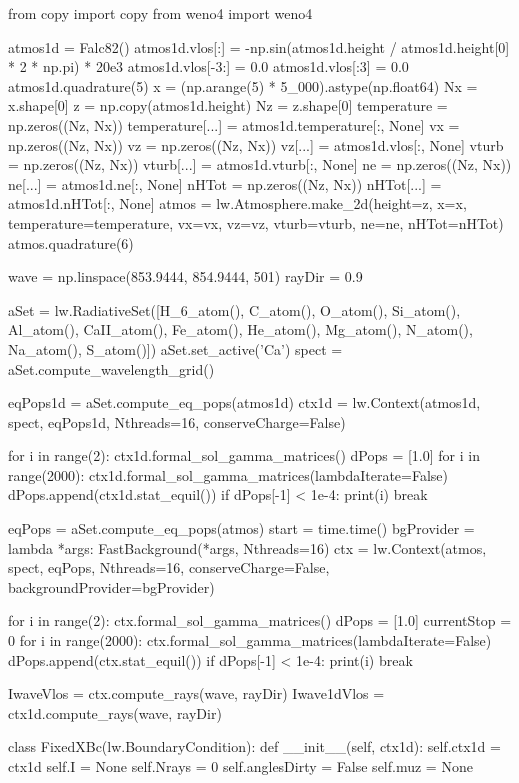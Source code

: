 \begin{pycode}[2DValidation]
from copy import copy
from weno4 import weno4

atmos1d = Falc82()
atmos1d.vlos[:] = -np.sin(atmos1d.height / atmos1d.height[0] * 2 * np.pi) * 20e3
atmos1d.vlos[-3:] = 0.0
atmos1d.vlos[:3] = 0.0
atmos1d.quadrature(5)
x = (np.arange(5) * 5_000).astype(np.float64)
Nx = x.shape[0]
z = np.copy(atmos1d.height)
Nz = z.shape[0]
temperature = np.zeros((Nz, Nx))
temperature[...] = atmos1d.temperature[:, None]
vx = np.zeros((Nz, Nx))
vz = np.zeros((Nz, Nx))
vz[...] = atmos1d.vlos[:, None]
vturb = np.zeros((Nz, Nx))
vturb[...] = atmos1d.vturb[:, None]
ne = np.zeros((Nz, Nx))
ne[...] = atmos1d.ne[:, None]
nHTot = np.zeros((Nz, Nx))
nHTot[...] = atmos1d.nHTot[:, None]
atmos = lw.Atmosphere.make_2d(height=z, x=x, temperature=temperature, vx=vx, vz=vz, vturb=vturb, ne=ne, nHTot=nHTot)
atmos.quadrature(6)

wave = np.linspace(853.9444, 854.9444, 501)
rayDir = 0.9

aSet = lw.RadiativeSet([H_6_atom(), C_atom(), O_atom(), Si_atom(), Al_atom(), CaII_atom(), Fe_atom(), He_atom(), Mg_atom(), N_atom(), Na_atom(), S_atom()])
aSet.set_active('Ca')
spect = aSet.compute_wavelength_grid()

eqPops1d = aSet.compute_eq_pops(atmos1d)
ctx1d = lw.Context(atmos1d, spect, eqPops1d, Nthreads=16, conserveCharge=False)


for i in range(2):
    ctx1d.formal_sol_gamma_matrices()
dPops = [1.0]
for i in range(2000):
    ctx1d.formal_sol_gamma_matrices(lambdaIterate=False)
    dPops.append(ctx1d.stat_equil())
    if dPops[-1] < 1e-4:
        print(i)
        break

eqPops = aSet.compute_eq_pops(atmos)
start = time.time()
bgProvider = lambda *args: FastBackground(*args, Nthreads=16)
ctx = lw.Context(atmos, spect, eqPops, Nthreads=16, conserveCharge=False, backgroundProvider=bgProvider)

for i in range(2):
    ctx.formal_sol_gamma_matrices()
dPops = [1.0]
currentStop = 0
for i in range(2000):
    ctx.formal_sol_gamma_matrices(lambdaIterate=False)
    dPops.append(ctx.stat_equil())
    if dPops[-1] < 1e-4:
        print(i)
        break

IwaveVlos = ctx.compute_rays(wave, rayDir)
Iwave1dVlos = ctx1d.compute_rays(wave, rayDir)


class FixedXBc(lw.BoundaryCondition):
    def __init__(self, ctx1d):
        self.ctx1d = ctx1d
        self.I = None
        self.Nrays = 0
        self.anglesDirty = False
        self.muz = None


\end{pycode}
